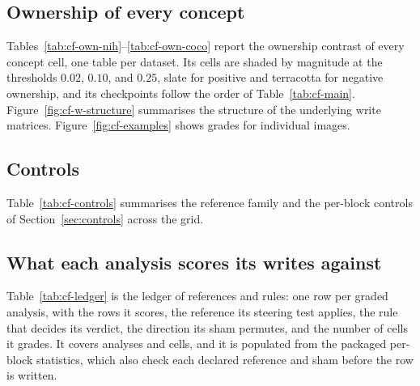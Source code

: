 

\subsection{Ownership of every concept}
\label{app:cf-tables}

Tables~\ref{tab:cf-own-nih}--\ref{tab:cf-own-coco} report the ownership contrast of every concept cell, one table per dataset. Its cells are shaded by magnitude at the thresholds $0.02$, $0.10$, and $0.25$, slate for positive and terracotta for negative ownership, and its checkpoints follow the order of Table~\ref{tab:cf-main}. Figure~\ref{fig:cf-w-structure} summarises the structure of the underlying write matrices. Figure~\ref{fig:cf-examples} shows grades for individual images.


\FloatBarrier

\subsection{Controls}
\label{app:cf-controls-sec}

Table~\ref{tab:cf-controls} summarises the reference family and the per-block controls of Section~\ref{sec:controls} across the grid.



\subsection{What each analysis scores its writes against}
\label{app:cf-ledger}

Table~\ref{tab:cf-ledger} is the ledger of references and rules: one row per graded analysis, with the rows it scores, the reference its steering test applies, the rule that decides its verdict, the direction its sham permutes, and the number of cells it grades. It covers \cfLedgerAnalyses{} analyses and \cfLedgerCells{} cells, and it is populated from the packaged per-block statistics, which also check each declared reference and sham before the row is written.

